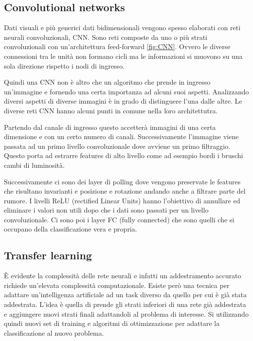 \documentclass{ieeeojies}
\begin{document}
\subsection{Convolutional networks}

\begin{figure*}
	\tiny{\def\svgwidth{\linewidth}
	}
\label{fig:CNN}
\caption{Schema generico di una rete convoluzionale}
\end{figure*}

Dati visuali e più generici dati bidimensionali vengono spesso elaborati con reti neurali convoluzionali, CNN. Sono reti composte da uno o più strati convoluzionali con un’architettura feed-forward \cref{fig:CNN}. Ovvero le diverse connessioni tra le unità non formano cicli ma le informazioni si muovono su una sola direzione rispetto i nodi di ingresso.

Quindi una CNN non è altro che un algoritmo che prende in ingresso un’immagine e fornendo una certa importanza ad alcuni suoi aspetti. Analizzando diversi aspetti di diverse immagini è in grado di distinguere l’una dalle altre. Le diverse reti CNN hanno alcuni punti in comune nella loro architettutra.

Partendo dal canale di ingresso questo accetterà immagini di una certa dimensione e con un certo numero di canali. Successivamente l’immagine viene passata ad un primo livello convoluzionale dove avviene un primo filtraggio. Questo porta ad estrarre features di alto livello come ad esempio bordi i bruschi cambi di luminosità.

Successivamente ci sono dei layer di polling dove vengono preservate le features che risultano invarianti e posizione e rotazione andando anche a filtrare parte del rumore. I livelli ReLU (rectified Linear Units) hanno l’obiettivo di annullare ed eliminare i valori non utili dopo che i dati sono passati per un livello convoluzionale. Ci sono poi i layer FC (fully connected) che sono quelli che si occupano della classificazione vera e propria.


\subsection{Transfer learning}

È evidente la complessità delle rete neurali e infatti un addestramento accurato richiede un’elevata complessità computazionale. Esiste però una tecnica per adattare un’intelligenza artificiale ad un task diverso da quello per cui è già stata addestrata. L’idea è quella di prende gli strati inferiori di una rete già addestrata e aggiungere nuovi strati finali adattandoli al problema di interesse. Si utilizzando quindi nuovi set di training e algoritmi di ottimizzazione per adattare la classificazione al nuovo problema.
\end{document}
